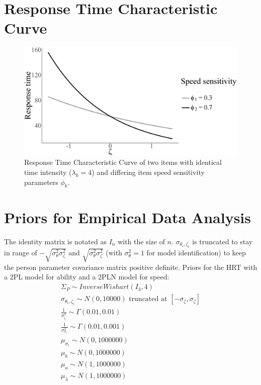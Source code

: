 \documentclass[a4paper,man,apacite,donotrepeattitle]{apa6}
\begin{document}
\section{Response Time Characteristic Curve}
\begin{figure}
	\begin{center}
	 \includegraphics[height = 0.25\textheight]{phi_theoret.eps}
	\end{center}		
	 \caption{Response Time Characteristic Curve of two items with identical time intensity ($\lambda_{k} = 4$) and differing item speed sensitivity parameters $\phi_{k}$.}
	 \label{fig:phi_theoret}
\end{figure}

\section{Priors for Empirical Data Analysis}
The identity matrix is notated as $I_n$ with the size of $n$. $\sigma_{\theta_i, \zeta_i}$ is truncated to stay in range of $-\sqrt{\sigma^2_{\theta}\sigma^2_{\zeta}} $ and $\sqrt{\sigma^2_{\theta}\sigma^2_{\zeta}}$ (with $\sigma^2_{\theta} = 1$ for model identification) to keep the person parameter covariance matrix positive definite.  Priors for the HRT with a 2PL model for ability and a 2PLN model for speed:
\begin{equation}
\begin{gathered}
\Sigma_P \sim InverseWishart(I_3, 4) \\
\sigma_{\theta_i, \zeta_i} \sim N(0, 10000) \text{ truncated at } [-\sigma_{\zeta},\sigma_{\zeta}] \\
\frac{1}{\sigma^2_{\zeta}} \sim \Gamma(0.01, 0.01)  \\
\frac{1}{\sigma^2_{\sigma_{\epsilon}}}  \sim \Gamma(0.01, 0.001) \\
\mu_{\sigma_{\epsilon}} \sim N(0, 1000000) \\
\mu_{b} \sim N(0, 1000000) \\
\mu_{a} \sim N(1, 1000000) \\
\mu_{\lambda} \sim N(1, 1000000)
\end{gathered}
\end{equation}
\end{document}
